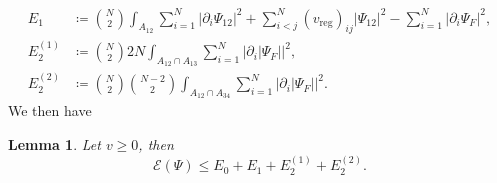 \documentclass[a4paper,11pt]{article}
\newcommand{\abs}[1]{\left\lvert #1 \right\rvert}
\newtheorem{lemma}[theorem]{Lemma}
\numberwithin{equation}{section}
\begin{document}
	\begin{equation}
	\begin{aligned}
	E_1&\coloneqq\binom{N}{2}\int_{A_{12}} \sum_{i=1}^{N}\abs{\partial_i\Psi_{12}}^2+\sum_{i<j}^{N}(v_{\text{reg}})_{ij}\abs{\Psi_{12}}^2-\sum_{i=1}^{N}\abs{\partial_i\Psi_F}^2, \\
	E_2^{(1)}&\coloneqq\binom{N}{2}2N\int_{A_{12}\cap A_{13}}\sum_{i=1}^{N}\abs{\partial_i\abs{\Psi_F}}^2,\\ E_2^{(2)}&\coloneqq\binom{N}{2}\binom{N-2}{2}\int_{A_{12}\cap A_{34}}\sum_{i=1}^{N}\abs{\partial_i\abs{\Psi_F}}^2.
	\end{aligned}
	\end{equation}
	We then have \begin{lemma}
		Let $ v\geq 0 $, then \begin{equation}\label{EqBound1}
		\mathcal{E}(\Psi)\leq E_0+ E_1+E_2^{(1)}+E_2^{(2)}.
		\end{equation}
	\end{lemma}
\end{document}

